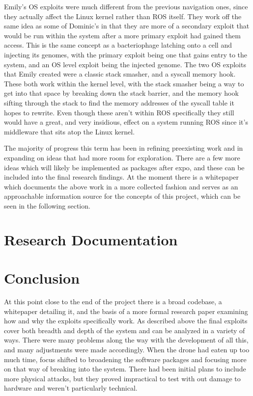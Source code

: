 \documentclass[IEEEtran,letterpaper,10pt,notitlepage,draftclsnofoot,onecolumn]{article}
\begin{document}
Emily's OS exploits were much different from the previous navigation ones, since they actually affect the Linux kernel rather than ROS itself. 
They work off the same idea as some of Dominic's in that they are more of a secondary exploit that would be run within the system after a more primary exploit had gained them access. 
This is the same concept as a bacteriophage latching onto a cell and injecting its genomes, with the primary exploit being one that gains entry to the system, and an OS level exploit being the injected genome.
The two OS exploits that Emily created were a classic stack smasher, and a syscall memory hook.
These both work within the kernel level, with the stack smasher being a way to get into that space by breaking down the stack barrier, and the memory hook sifting through the stack to find the memory addresses of the syscall table it hopes to rewrite.
Even though these aren't within ROS specifically they still would have a great, and very insidious, effect on a system running ROS since it's middleware that sits atop the Linux kernel.


The majority of progress this term has been in refining preexisting work and in expanding on ideas that had more room for exploration.
There are a few more ideas which will likely be implemented as packages after expo, and these can be included into the final research findings. 
At the moment there is a whitepaper which documents the above work in a more collected fashion and serves as an approachable information source for the concepts of this project, which can be seen in the following section.

\section{Research Documentation}



\section{Conclusion}
At this point close to the end of the project there is a broad codebase, a whitepaper detailing it, and the basis of a more formal research paper examining how and why the exploits specifically work.
As described above the final exploits cover both breadth and depth of the system and can be analyzed in a variety of ways.
There were many problems along the way with the development of all this, and many adjustments were made accordingly. 
When the drone had eaten up too much time, focus shifted to broadening the software packages and focusing more on that way of breaking into the system.
There had been initial plans to include more physical attacks, but they proved impractical to test with out damage to hardware and weren't particularly technical. 
\end{document}
